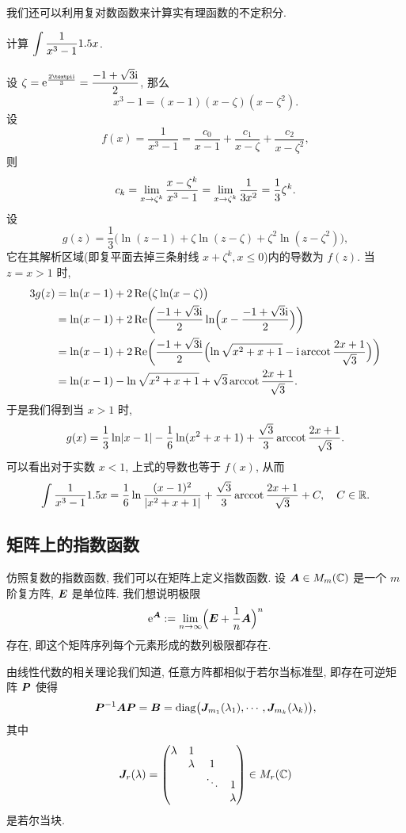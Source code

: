 我们还可以利用复对数函数来计算实有理函数的不定积分.

\begin{example}
  \label{exam:int-rational-function}
  计算 $\displaystyle\int \frac1{x^3-1}1.5 x$.
\end{example}
  
\begin{solution}
  设 $\zeta=\ee^{\frac{2\cpi\ii}3}=\dfrac{-1+\sqrt3\ii}2$, 那么
  \[
    x^3-1=(x-1)(x-\zeta)(x-\zeta^2).
  \]
  设
  \[
     f(x)
    =\frac1{x^3-1}
    =\frac{c_0}{x-1}+\frac{c_1}{x-\zeta}+\frac{c_2}{x-\zeta^2},
  \]
  则
  \[
     c_k
    =\lim_{x\rightarrow \zeta^k} \frac{x-\zeta^k}{x^3-1}
    =\lim_{x\rightarrow \zeta^k} \frac1{3x^2}
    =\frac13\zeta^k.
  \]
  设
  \[
    g(z)=\frac13\bigl(
      \ln(z-1)+\zeta\ln(z-\zeta)+\zeta^2\ln(z-\zeta^2)
    \bigr),
  \]
  它在其解析区域(即复平面去掉三条射线 $x+\zeta^k,x\le 0$)内的导数为 $f(z)$.
  当 $z=x>1$ 时, 
  \begin{align*}
    3g(z)&
    =\ln(x-1)+2\operatorname{Re}\bigl(\zeta\ln(x-\zeta)\bigr)\\&
    =\ln(x-1)+2\operatorname{Re}\biggl(\frac{-1+\sqrt3\mathrm{i}}2\ln\Bigl(x-\frac{-1+\sqrt3\mathrm{i}}2\Bigr)\biggr)\\&
    =\ln(x-1)+2\operatorname{Re}\biggl(
      \frac{-1+\sqrt3\mathrm{i}}2
        \Bigl(\ln\sqrt{x^2+x+1}-\mathrm{i}\operatorname{arccot}\frac{2x+1}{\sqrt3}\Bigr)
      \biggr)\\&
    =\ln(x-1)-\ln\sqrt{x^2+x+1}+\sqrt 3\operatorname{arccot}\frac{2x+1}{\sqrt3}.
  \end{align*}
  于是我们得到当 $x>1$ 时,
  \[
    g(x)=\frac13\ln\lvert x-1\rvert-\frac16\ln(x^2+x+1)
      +\frac{\sqrt3}3\operatorname{arccot}\frac{2x+1}{\sqrt3}.
  \]
  可以看出对于实数 $x<1$, 上式的导数也等于 $f(x)$, 从而
  \[
    \int\frac1{x^3-1}1.5 x
    =\frac16\ln\frac{(x-1)^2}{\lvert x^2+x+1\rvert}
      +\frac{\sqrt3}3\operatorname{arccot}\frac{2x+1}{\sqrt3}+C,
      \quad C\in{\mathbb{R}}.
  \]
\end{solution}



\subsection{矩阵上的指数函数\optional}

仿照复数的指数函数, 我们可以在矩阵上定义指数函数.
设 ${\boldsymbol{A}}\in M_m({\mathbb{C}})$ 是一个 $m$ 阶复方阵, ${\boldsymbol{E}}$ 是单位阵.
我们想说明极限
\[
  \mathrm{e}^{\boldsymbol{A}}:=\lim_{n\rightarrow \infty}\Bigl({\boldsymbol{E}}+\frac1n {\boldsymbol{A}}\Bigr)^n
\]
存在, 即这个矩阵序列每个元素形成的数列极限都存在.

由线性代数的相关理论我们知道, 任意方阵都相似于若尔当标准型, 即存在可逆矩阵 ${\boldsymbol{P}}$ 使得
\[
   {\boldsymbol{P}}^{-1}{\boldsymbol{A}}{\boldsymbol{P}}
  ={\boldsymbol{B}}
  ={\mathrm{diag}}\bigl({\boldsymbol{J}}_{m_1}(\lambda_1),\cdots,{\boldsymbol{J}}_{m_k}(\lambda_k)\bigr),
\]
其中
\[
  {\boldsymbol{J}}_r(\lambda)=\begin{pmatrix}
    \lambda&1&   &\\
    &\lambda& 1 &\\
    & &\ddots&1\\
    & &      &\lambda
  \end{pmatrix}\in M_r({\mathbb{C}})
\]
是若尔当块.

